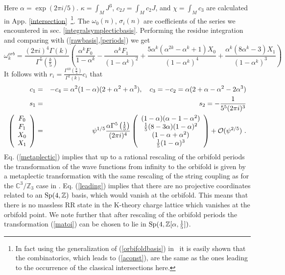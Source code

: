 \documentclass[12pt]{article}
\def\a{\alpha}
\begin{document}
Here  $\alpha=\exp(2 \pi i/5)$. $\kappa=\int_MJ^3$,
$c_{2J}=\int_M c_2 J$, and $\chi=\int_M c_3$ are calculated
in App. \ref{intersection}~\footnote{In fact using the
generalization of (\ref{orbifoldbasis}) in~\cite{Klemm:1992tx} it
is easily shown that the combinatorics, which leads to
(\ref{aconst}), are the same as the ones leading to the occurrence
of the classical intersections here.}.  The $\omega_0(n)$,
$\sigma_i(n)$ are coefficients of the series we encountered in
sec. \ref{integralsymplecticbasis}. Performing the residue
integration and comparing with (\ref{rawbasis},\ref{periods}) we
get
\begin{equation}
\omega_k^{orb}=\frac{(2 \pi i)^4 \Gamma(k)}{\Gamma^5\left(\frac{k}{5}\right)}\left(
\frac{\a^k F_0}{1-\a^k}-
\frac{\a^k F_1}{(1-\a^k)^2}+
\frac{5\a^k(\a^{2 k}-\a^k +1)X_0}{(1-\a^k)^4}+
\frac{\a^k(8\a^{k}-3)X_1}{(1-\a^k)^3}\right)
\label{matoi}
\end{equation}
It follows with $r_i=\frac{\Gamma^{10}\left(\frac{k}{5}\right)}{\Gamma^2(k)} c_i$
that
\begin{eqnarray}
c_1&=&-c_4=\a^2 (1-\a)(2+\a^2+\a^3), \quad  c_3=-c_2=\a(2+\a-\a^2-2 \a^3)\nonumber \\
s_1&=&s_2 =-\frac{1}{5^5(2\pi i)^3} \label{metaplectic}\\
\left(\begin{array}{c}F_0\\ F_1\\X_0\\X_1 \end{array} \right)&=&
\psi^{1/5}\frac{\a \Gamma^5\left(1\over 5\right)}{(2 \pi i)^4} \left(\begin{array}{c}
(1-\a)(\a-1-\a^2)\\
\frac{1}{5}(8-3 \a) (1-\a)^2\\
(1-\a+\a^2)\\
\frac{1}{5}(1-\a)^3 \end{array}\right)+{\cal O}(\psi^{2/5})\ . \label{leading}
\end{eqnarray}
Eq. (\ref{metaplectic}) implies that up to a rational rescaling of
the orbifold periods the transformation of the wave functions from
infinity to the orbifold is given by a metaplectic transformation
with the same rescaling of the string coupling as for the
$\mathbb{C}^3/\mathbb{Z}_3$ case in \cite{Aganagic:2003db}. Eq.
(\ref{leading}) implies that there are no projective coordinates
related to an  ${\rm Sp}(4,\mathbb{Z})$ basis, which would vanish
at the orbifold. This means that there is no massless RR state in
the K-theory charge lattice which  vanishes at the orbifold point.
We note further that after rescaling of the orbifold periods the
transformation (\ref{matoi}) can be chosen to lie in ${\rm
Sp}(4,\mathbb{Z}[\a,\frac{1}{5}])$.
\end{document}
